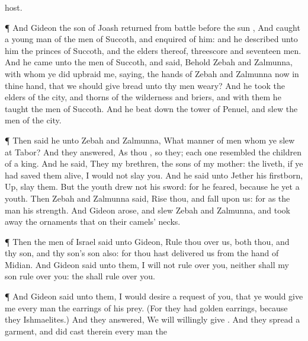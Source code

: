 {host.
\par }{\PP {}¶ And
Gideon the
son of
Joash
returned from
battle
before the
sun
{},
And
caught a young
man of the
men of
Succoth, and
enquired of him: and he
described unto him the
princes of
Succoth, and the
elders thereof,
{} threescore and
seventeen
men.
And he
came unto the
men of
Succoth, and
said, Behold
Zebah and
Zalmunna, with whom ye did
upbraid me,
saying,
{} the
hands of
Zebah and
Zalmunna now in thine
hand, that we should
give
bread unto thy
men
{}
weary?
And he
took the
elders of the
city, and
thorns of the
wilderness and
briers, and with them he
taught the
men of
Succoth.
And he beat
down the
tower of
Penuel, and
slew the
men of the
city.
\par }{\PP {}¶ Then
said he unto
Zebah and
Zalmunna,
What manner of
men
{} whom ye
slew at
Tabor? And they
answered, As
thou
{}, so
{} they; each
one
resembled the
children of a
king.
And he
said, They
{} my
brethren,
{} the
sons of my
mother:
{} the
{}
liveth,
if ye had saved them
alive, I would not
slay you.
And he
said unto
Jether his
firstborn,
Up,
{}
slay them. But the
youth
drew not his
sword: for he
feared, because he
{} yet a
youth.
Then
Zebah and
Zalmunna
said,
Rise thou, and
fall upon us: for as the
man
{} his
strength. And
Gideon
arose, and
slew
Zebah and
Zalmunna, and took
away the
ornaments that
{} on their
camels’
necks.
\par }{\PP {}¶ Then the
men of
Israel
said unto
Gideon,
Rule thou over us, both thou, and thy
son, and thy
son’s
son also: for thou hast
delivered us from the
hand of
Midian.
And
Gideon
said unto them, I will not
rule over you, neither shall my
son
rule over you: the
{} shall
rule over you.
\par }{\PP {}¶ And
Gideon
said unto them, I would
desire a
request of you, that ye would
give me every
man the
earrings of his
prey. (For they had
golden
earrings, because they
{}
Ishmaelites.)
And they
answered, We will
willingly
give
{}. And they
spread a
garment, and did
cast therein every
man the
}

